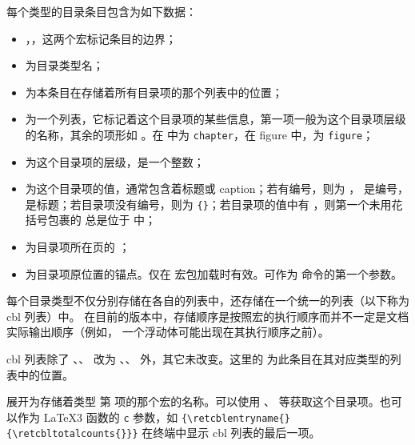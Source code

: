 \documentclass{whudoc}
\begin{document}
每个类型的目录条目包含为如下数据：

{\centering {}\par}

\begin{itemize}[nosep]
  \item {}，，这两个宏标记条目的边界；
  \item {} 为目录类型名；
  \item {} 为本条目在存储着所有目录项的那个列表中的位置；
  \item {} 为一个列表，它标记着这个目录项的某些信息，第一项一般为这个目录项层级的名称，其余的项形如 。在  中为 \texttt{chapter}，在 figure 中，为 \texttt{figure}；
  \item {} 为这个目录项的层级，是一个整数；
  \item {} 为这个目录项的值，通常包含着标题或 caption；若有编号，则为 ， 是编号， 是标题；若目录项没有编号，则为 \texttt{\{\}}；若目录项的值中有 ，则第一个未用花括号包裹的  总是位于  中；
  \item {} 为目录项所在页的 ；
  \item {} 为目录项原位置的锚点。仅在  宏包加载时有效。可作为  命令的第一个参数。
\end{itemize}

每个目录类型不仅分别存储在各自的列表中，还存储在一个统一的列表（以下称为 cbl 列表）中。
在目前的版本中，存储顺序是按照宏的执行顺序而并不一定是文档实际输出顺序（例如，
一个浮动体可能出现在其执行顺序之前）。

cbl 列表除了 、、
 改为 、、
 外，其它未改变。这里的  为此条目在其对应类型的列表中的位置。

\begin{function}[EXP]{\retcblentryname}
  \begin{syntax}
    \V\retcblentryname {} 
  \end{syntax}
展开为存储着类型  第  项的那个宏的名称。可以使用 、\linebreak
{} 等获取这个目录项。也可以作为 \LaTeX3 函数的 \texttt{c} 参数，如  \verb|{\retcblentryname{}{\retcbltotalcounts{}}}| 在终端中显示 cbl 列表的最后一项。
\end{function}
\end{document}
